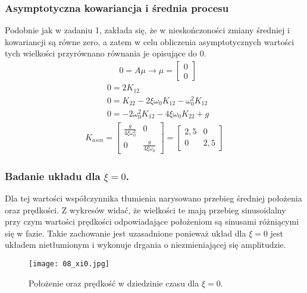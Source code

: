 \documentclass[a4paper,15pt]{article}
\begin{document}
\subsubsection{Asymptotyczna kowariancja i średnia procesu}
Podobnie jak w zadaniu 1, zakłada się, że w nieskończoności zmiany średniej i kowariancji są równe zero, a zatem w celu obliczenia asymptotycznych wartości tych wielkości przyrównano równania je opisujące do 0.
\begin{align*}
& 0 = A\mu \rightarrow \mu = \begin{bmatrix}
0 \\ 0
\end{bmatrix}
\end{align*}
\begin{align*}
& 0 = 2K_{12} \\
& 0 = K_{22} - 2\xi\omega _0 K_{12} - \omega _{0}^{2}K_{12} \\
& 0 = -2\omega _0^2 K_{12} - 4\xi \omega_0 K_{22} +g 
\end{align*}
\begin{align*}
K_{asm} = \begin{bmatrix}
\frac{g}{4\xi \omega _0^3} & 0 \\
0 & \frac{g}{4\xi \omega _0}
\end{bmatrix}
=
\begin{bmatrix}
2,5 & 0 \\
0 & 2,5
\end{bmatrix}
\end{align*}

\subsubsection{Badanie układu dla \( \xi = 0 \).}
Dla tej wartości współczynnika tłumienia narysowano przebieg średniej położenia oraz prędkości. Z wykresów widać, że wielkości te mają przebieg sinusoidalny przy czym wartości prędkości odpowiadające położeniom są sinusami różniącymi się w fazie. Takie zachowanie jest uzasadnione ponieważ układ dla \( \xi =0 \) jest układem nietłumionym i wykonuje drgania o niezmieniającej się amplitudzie.

\begin{figure}[H]
\centerline{\texttt{[image: 08\_xi0.jpg]}}
\centering
\caption{Położenie oraz prędkość w dziedzinie czasu dla \( \xi = 0 \). }
\label{fig:08_xi0}
\end{figure}
\end{document}
